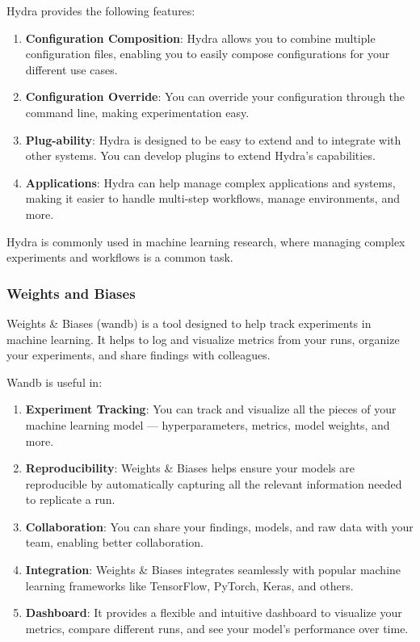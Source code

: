 Hydra provides the following features:
\begin{enumerate}
    \item \textbf{Configuration Composition}: Hydra allows you to combine multiple configuration files, enabling you to easily compose configurations for your different use cases.
    \item \textbf{Configuration Override}: You can override your configuration through the command line, making experimentation easy.
    \item \textbf{Plug-ability}: Hydra is designed to be easy to extend and to integrate with other systems. You can develop plugins to extend Hydra's capabilities.
    \item \textbf{Applications}: Hydra can help manage complex applications and systems, making it easier to handle multi-step workflows, manage environments, and more.
\end{enumerate}
Hydra is commonly used in machine learning research, where managing complex experiments and workflows is a common task.

\subsubsection{Weights and Biases}
Weights \& Biases (wandb) is a tool designed to help track experiments in machine learning. It helps to log and visualize metrics from your runs, organize your experiments, and share findings with colleagues.

Wandb is useful in:
\begin{enumerate}
    \item \textbf{Experiment Tracking}: You can track and visualize all the pieces of your machine learning model — hyperparameters, metrics, model weights, and more.
    \item \textbf{Reproducibility}: Weights \& Biases helps ensure your models are reproducible by automatically capturing all the relevant information needed to replicate a run.
    \item \textbf{Collaboration}: You can share your findings, models, and raw data with your team, enabling better collaboration.
    \item \textbf{Integration}: Weights \& Biases integrates seamlessly with popular machine learning frameworks like TensorFlow, PyTorch, Keras, and others.
    \item \textbf{Dashboard}: It provides a flexible and intuitive dashboard to visualize your metrics, compare different runs, and see your model's performance over time.
\end{enumerate}

